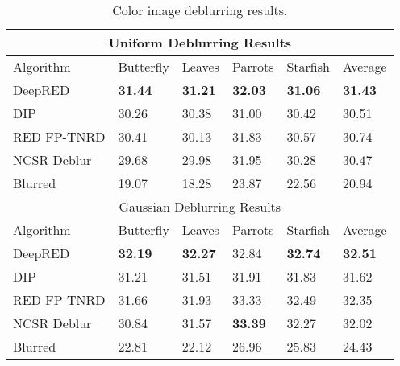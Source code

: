 \documentclass[12pt]{article}
\begin{document}
\begin{table}[!ht]
 \centering
 \footnotesize\addtolength{\tabcolsep}{-5pt}
\begin{tabularx}{\linewidth}{|l||X X X X||X|}
 \hline
 \multicolumn{6}{|c|}{Uniform Deblurring Results} \\
 \hline
 Algorithm & \textsf{Butterfly} & \textsf{Leaves} & \textsf{Parrots} & \textsf{Starfish} & Average \\ \hline
DeepRED & \textbf{31.44} & \textbf{31.21} & \textbf{32.03} & \textbf{31.06} & \textbf{31.43} \\
DIP & 30.26 & 30.38 & 31.00 & 30.42 & 30.51 \\
RED FP-TNRD & 30.41 & 30.13 & 31.83 & 30.57 & 30.74 \\
NCSR Deblur & 29.68 & 29.98 & 31.95 & 30.28 & 30.47 \\
Blurred & 19.07 & 18.28 & 23.87 & 22.56 & 20.94 \\
 \hline
  \multicolumn{6}{|c|}{Gaussian Deblurring Results} \\
 \hline
 Algorithm & \textsf{Butterfly} & \textsf{Leaves} & \textsf{Parrots} & \textsf{Starfish} & Average \\ \hline
DeepRED & \textbf{32.19} & \textbf{32.27} & 32.84 & \textbf{32.74} & \textbf{32.51} \\
DIP & 31.21	& 31.51	& 31.91	& 31.83 & 31.62 \\
RED FP-TNRD & 31.66 & 31.93 & 33.33 & 32.49 & 32.35 \\
NCSR Deblur & 30.84 & 31.57 & \textbf{33.39} & 32.27 & 32.02 \\
Blurred & 22.81 & 22.12 & 26.96 & 25.83 & 24.43 \\
 \hline
\end{tabularx}
\caption{Color image deblurring results.}
\label{Tab:blur}
\end{table}
\end{document}
